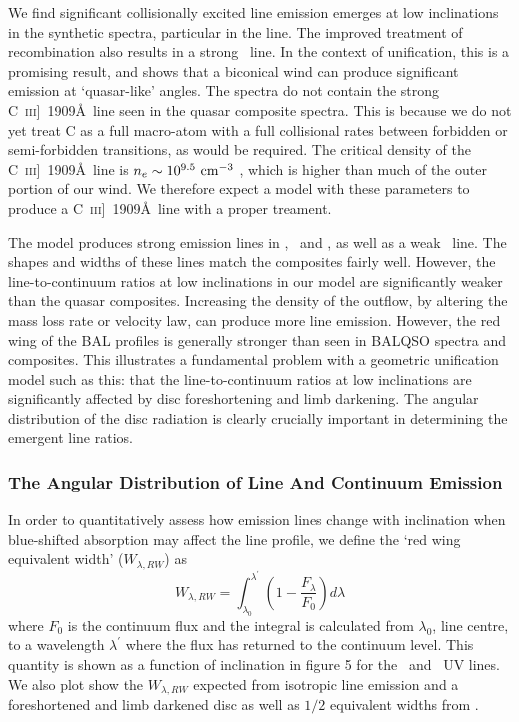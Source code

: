 \documentclass[useAMS,usenatbib]{mn2e_x}
\begin{document}
We find significant collisionally excited line emission emerges
at low inclinations in the synthetic spectra, particular in the \civ line.
The improved treatment of recombination also results in a strong \la\ line. 
In the context of unification, this is a promising result, 
and shows that a biconical wind can produce significant 
emission at `quasar-like' angles. 
The spectra do not contain the strong C~\textsc{iii}]~1909\AA\, 
line seen in the quasar composite spectra. 
This is because we do not yet treat C as a full macro-atom with a 
full collisional rates between forbidden
or semi-forbidden transitions, as would be required.
The critical density of the C~\textsc{iii}]~1909\AA\, line 
is $n_e\sim10^{9.5}~\rm{cm^{-3}}$ \citep{wei1988}, which is higher than much of the 
outer portion of our wind. 
We therefore expect a model with these 
parameters to produce a C~\textsc{iii}]~1909\AA\ line
with a proper treament. 

The model produces strong emission lines in \civ, \nv\ and \la,
as well as a weak \mg\ line. The shapes and widths of these lines
match the composites fairly well. However, the line-to-continuum ratios 
at low inclinations in our model are significantly weaker than the quasar 
composites. Increasing the density of the outflow, by altering the mass 
loss rate  or velocity law, can produce more line emission.
However, the red wing of the BAL profiles is generally stronger than 
seen in BALQSO spectra and composites. This illustrates a fundamental 
problem with a geometric unification model such as this:
that the line-to-continuum ratios at low inclinations are
significantly affected by disc foreshortening and limb darkening.
The angular distribution of the disc radiation is clearly
crucially important in determining the emergent line ratios.

\subsubsection{The Angular Distribution of Line And Continuum Emission}
\label{angular}

In order to quantitatively assess how emission lines change with 
inclination when blue-shifted absorption 
may affect the line profile, we define the `red wing equivalent width' ($W_{\lambda,RW}$) as
\begin{equation}
W_{\lambda,RW} = \int_{\lambda_0}^{\lambda^\prime} \left( 1 - \frac{F_\lambda}{F_0} \right) d\lambda
\label{rwew}
\end{equation}
where $F_0$ is the continuum flux and the integral is calculated from $\lambda_0$, line centre,
to a wavelength $\lambda^\prime$ where the flux has returned to the continuum level.
This quantity is shown as a function of inclination in figure 5 for the \civ\ and \mg\ UV lines.
We also plot show the $W_{\lambda,RW}$ expected from isotropic line emission and a foreshortened 
and limb darkened disc  as well as $1/2$ equivalent widths from \cite{dipompeo2012b}. 
\end{document}
